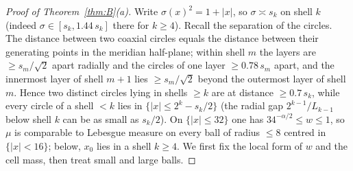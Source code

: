 \documentclass[11pt]{amsart}
\newcommand{\abs}[1]{\lvert #1\rvert}
\theoremstyle{plain}
\theoremstyle{definition}
\theoremstyle{remark}
\begin{document}
\begin{proof}[Proof of Theorem~\ref{thm:B}(a)]
Write $\sigma(x)^2=1+\abs x$, so $\sigma\asymp s_k$ on shell $k$ (indeed
$\sigma\in[s_k,1.44\,s_k]$ there for $k\ge4$). Recall the separation of the
circles. The distance between two coaxial circles equals the distance between
their generating points in the meridian half-plane; within shell $m$ the layers
are $\ge s_m/\sqrt2$ apart radially and the circles of one layer $\ge0.78\,s_m$
apart, and the innermost layer of shell $m+1$ lies $\ge s_m/\sqrt2$ beyond the
outermost layer of shell $m$. Hence two distinct circles lying in shells $\ge k$
are at distance $\ge0.7\,s_k$, while every circle of a shell $<k$ lies in
$\{\abs x\le2^k-s_k/2\}$ (the radial gap $2^{k-1}/L_{k-1}$ below shell $k$ can be
as small as $s_k/2$). On $\{\abs x\le32\}$ one has $34^{-\alpha/2}\le w\le1$, so
$\mu$ is comparable to Lebesgue measure on every ball of radius $\le8$ centred in
$\{\abs x<16\}$; below, $x_0$ lies in a shell $k\ge4$. We first fix the local
form of $w$ and the cell mass, then treat small and large balls.


\end{proof}
\end{document}
